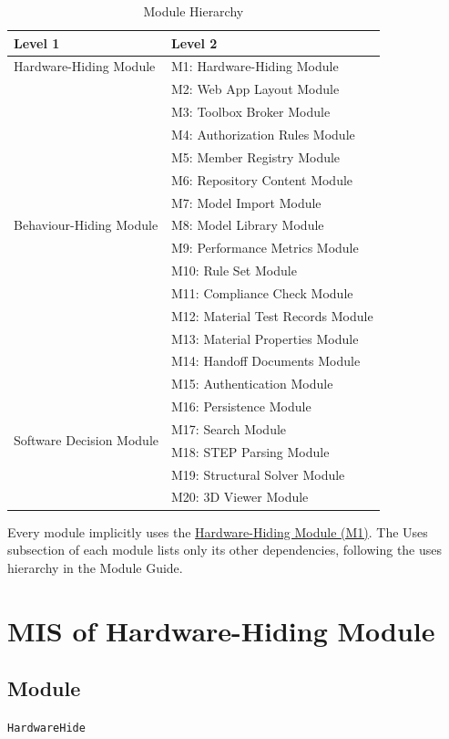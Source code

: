 \documentclass[12pt, titlepage]{article}
\begin{document}
\begin{table}[h!]
\centering
\begin{tabular}{p{} p{}}
\toprule
\textbf{Level 1} & \textbf{Level 2}\\
\midrule


{Hardware-Hiding Module} & M1: Hardware-Hiding Module \\
\midrule
\multirow{13}{0.3\textwidth}{Behaviour-Hiding Module} & M2: Web App Layout Module\\
& M3: Toolbox Broker Module\\
& M4: Authorization Rules Module\\
& M5: Member Registry Module\\
& M6: Repository Content Module\\
& M7: Model Import Module\\
& M8: Model Library Module\\
& M9: Performance Metrics Module\\
& M10: Rule Set Module\\
& M11: Compliance Check Module\\
& M12: Material Test Records Module\\
& M13: Material Properties Module\\
& M14: Handoff Documents Module\\
\midrule
\multirow{6}{0.3\textwidth}{Software Decision Module} & M15: Authentication Module\\
& M16: Persistence Module\\
& M17: Search Module\\
& M18: STEP Parsing Module\\
& M19: Structural Solver Module\\
& M20: 3D Viewer Module\\
\bottomrule


\end{tabular}
\caption{Module Hierarchy}
\label{TblMH}
\end{table}

Every module implicitly uses the \hyperref[mHH]{Hardware-Hiding Module (M1)}. The Uses subsection of each module lists only its other dependencies, following the uses hierarchy in the Module Guide.
\newpage
\section{MIS of Hardware-Hiding Module} \label{mHH}

\subsection{Module}
\texttt{HardwareHide}
\end{document}
